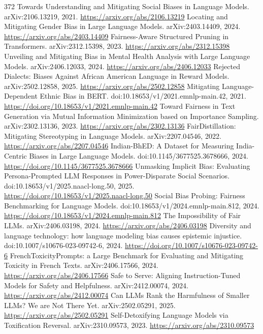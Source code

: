 \documentclass[11pt]{article}
\begin{document}
\begin{thebibliography}{372}
 Towards Understanding and Mitigating Social Biases in Language Models. arXiv:2106.13219, 2021. \url{https://arxiv.org/abs/2106.13219}
 Locating and Mitigating Gender Bias in Large Language Models. arXiv:2403.14409, 2024. \url{https://arxiv.org/abs/2403.14409}
 Fairness-Aware Structured Pruning in Transformers. arXiv:2312.15398, 2023. \url{https://arxiv.org/abs/2312.15398}
 Unveiling and Mitigating Bias in Mental Health Analysis with Large Language Models. arXiv:2406.12033, 2024. \url{https://arxiv.org/abs/2406.12033}
 Rejected Dialects: Biases Against African American Language in Reward Models. arXiv:2502.12858, 2025. \url{https://arxiv.org/abs/2502.12858}
 Mitigating Language-Dependent Ethnic Bias in BERT. doi:10.18653/v1/2021.emnlp-main.42, 2021. \url{https://doi.org/10.18653/v1/2021.emnlp-main.42}
 Toward Fairness in Text Generation via Mutual Information Minimization based on Importance Sampling. arXiv:2302.13136, 2023. \url{https://arxiv.org/abs/2302.13136}
 FairDistillation: Mitigating Stereotyping in Language Models. arXiv:2207.04546, 2022. \url{https://arxiv.org/abs/2207.04546}
 Indian-BhED: A Dataset for Measuring India-Centric Biases in Large Language Models. doi:10.1145/3677525.3678666, 2024. \url{https://doi.org/10.1145/3677525.3678666}
 Unmasking Implicit Bias: Evaluating Persona-Prompted LLM Responses in Power-Disparate Social Scenarios. doi:10.18653/v1/2025.naacl-long.50, 2025. \url{https://doi.org/10.18653/v1/2025.naacl-long.50}
 Social Bias Probing: Fairness Benchmarking for Language Models. doi:10.18653/v1/2024.emnlp-main.812, 2024. \url{https://doi.org/10.18653/v1/2024.emnlp-main.812}
 The Impossibility of Fair LLMs. arXiv:2406.03198, 2024. \url{https://arxiv.org/abs/2406.03198}
 Diversity and language technology: how language modeling bias causes epistemic injustice. doi:10.1007/s10676-023-09742-6, 2024. \url{https://doi.org/10.1007/s10676-023-09742-6}
 FrenchToxicityPrompts: a Large Benchmark for Evaluating and Mitigating Toxicity in French Texts. arXiv:2406.17566, 2024. \url{https://arxiv.org/abs/2406.17566}
 Safe to Serve: Aligning Instruction-Tuned Models for Safety and Helpfulness. arXiv:2412.00074, 2024. \url{https://arxiv.org/abs/2412.00074}
 Can LLMs Rank the Harmfulness of Smaller LLMs? We are Not There Yet. arXiv:2502.05291, 2025. \url{https://arxiv.org/abs/2502.05291}
 Self-Detoxifying Language Models via Toxification Reversal. arXiv:2310.09573, 2023. \url{https://arxiv.org/abs/2310.09573}

\end{thebibliography}
\end{document}
